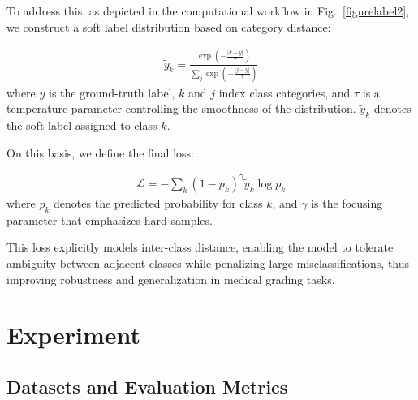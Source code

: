 \documentclass[letterpaper, 10 pt, conference]{ieeeconf}  %
\begin{document}
To address this, as depicted in the computational workflow in Fig.~\ref{figurelabel2}, we construct a soft label distribution based on category distance:

\begin{equation}
\begin{aligned}
    \tilde{y}_k = \frac{\exp\left(-\frac{|k - y|}{\tau}\right)}{\sum_{j} \exp\left(-\frac{|j - y|}{\tau}\right)}
\end{aligned}
\end{equation}
where \(y\) is the ground-truth label, \(k\) and \(j\) index class categories, and \(\tau\) is a temperature parameter controlling the smoothness of the distribution. \(\tilde{y}_k\) denotes the soft label assigned to class \(k\).

On this basis, we define the final loss:

\begin{equation}
\begin{aligned}
    \mathcal{L} = - \sum_{k} (1 - p_k)^{\gamma} \tilde{y}_k \log p_k
\end{aligned}
\end{equation}
where \(p_k\) denotes the predicted probability for class \(k\), and \(\gamma\) is the focusing parameter that emphasizes hard samples.

This loss explicitly models inter-class distance, enabling the model to tolerate ambiguity between adjacent classes while penalizing large misclassifications, thus improving robustness and generalization in medical grading tasks.

\section{Experiment}
\subsection{Datasets and Evaluation Metrics}
\end{document}
